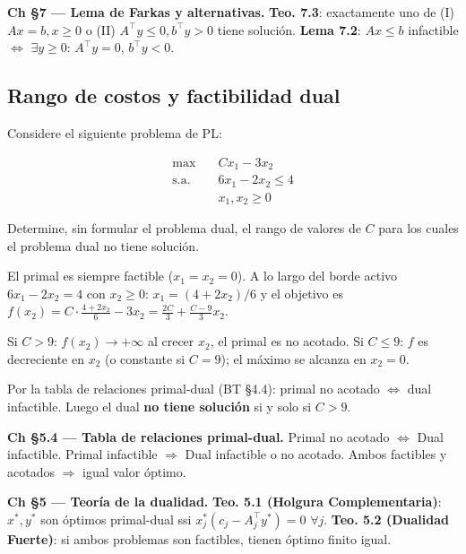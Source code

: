\documentclass[12pt]{article}
\theoremstyle{plain}
\begin{document}
\begin{teofund}
\textbf{Ch §7 — Lema de Farkas y alternativas.} \textbf{Teo. 7.3}: exactamente uno de (I) $Ax=b,x\geq 0$ o (II) $A^\top y\leq 0,b^\top y>0$ tiene solución. \textbf{Lema 7.2}: $Ax\leq b$ infactible $\Leftrightarrow$ $\exists y\geq 0$: $A^\top y=0$, $b^\top y<0$.
\end{teofund}

\bigskip

\subsection{Rango de costos y factibilidad dual}

Considere el siguiente problema de PL:

\[
      \begin{aligned}
            \max\quad        & Cx_1 - 3x_2        \\
            \text{s.a.}\quad & 6x_1 - 2x_2 \leq 4 \\
                             & x_1, x_2 \geq 0
      \end{aligned}
\]

Determine, sin formular el problema dual, el rango de valores de $C$ para los cuales el
problema dual no tiene solución.

\begin{solucion}

El primal es siempre factible ($x_1=x_2=0$). A lo largo del borde activo $6x_1-2x_2=4$ con $x_2\geq 0$: $x_1=(4+2x_2)/6$ y el objetivo es $f(x_2)=C\cdot\frac{4+2x_2}{6}-3x_2=\frac{2C}{3}+\frac{C-9}{3}x_2$.

Si $C>9$: $f(x_2)\to+\infty$ al crecer $x_2$, el primal es no acotado.
Si $C\leq 9$: $f$ es decreciente en $x_2$ (o constante si $C=9$); el máximo se alcanza en $x_2=0$.

Por la tabla de relaciones primal-dual (BT §4.4): primal no acotado $\Leftrightarrow$ dual infactible. Luego el dual \textbf{no tiene solución} si y solo si $\boxed{C>9}$.

\end{solucion}

\begin{teofund}
\textbf{Ch §5.4 — Tabla de relaciones primal-dual.} Primal no acotado $\Leftrightarrow$ Dual infactible. Primal infactible $\Rightarrow$ Dual infactible o no acotado. Ambos factibles y acotados $\Rightarrow$ igual valor óptimo.

\textbf{Ch §5 — Teoría de la dualidad.} \textbf{Teo. 5.1 (Holgura Complementaria)}: $x^*,y^*$ son óptimos primal-dual ssi $x^*_j(c_j-A_j^\top y^*)=0$ $\forall j$. \textbf{Teo. 5.2 (Dualidad Fuerte)}: si ambos problemas son factibles, tienen óptimo finito igual.
\end{teofund}
\end{document}
